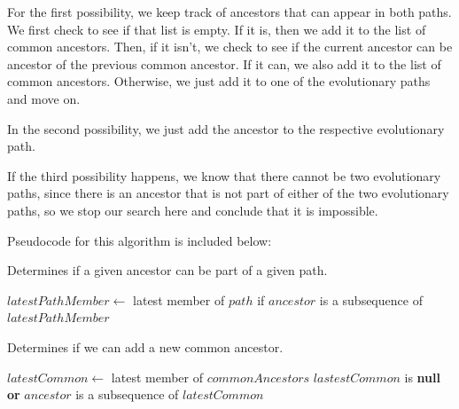 \documentclass[12pt]{article}
\begin{document}
For the first possibility, we keep track of ancestors that can
appear in both paths. We first check to see if that list is
empty. If it is, then we add it to the list of common ancestors.
Then, if it isn't, we check to see if the current ancestor can
be ancestor of the previous common ancestor. If it can, we also
add it to the list of common ancestors. Otherwise, we just
add it to one of the evolutionary paths and move on.

In the second possibility, we just add the ancestor to the
respective evolutionary path.

If the third possibility happens, we know that there cannot be
two evolutionary paths, since there is an ancestor that is not
part of either of the two evolutionary paths, so we stop
our search here and conclude that it is impossible.

Pseudocode for this algorithm is included below:

\begin{algorithm}[H]
\caption{Determines if a given ancestor can be part of a given path.}
\begin{algorithmic}
        \State $latestPathMember \gets$ latest member of $path$
        \State \Return if $ancestor$ is a subsequence of $latestPathMember$
    \EndProcedure
\end{algorithmic}
\end{algorithm}

\begin{algorithm}[H]
\caption{Determines if we can add a new common ancestor.}
\begin{algorithmic}
        \State $latestCommon \gets$ latest member of $commonAncestors$
        \State \Return $lastestCommon$ is {\bf null} {\bf or} $ancestor$ is a subsequence of $latestCommon$
    \EndProcedure
\end{algorithmic}
\end{algorithm}
\end{document}
